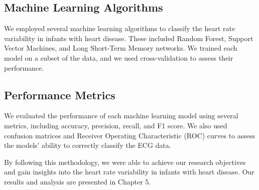 \subsection{Machine Learning Algorithms}

We employed several machine learning algorithms to classify the heart rate variability in infants with heart disease. These included Random Forest, Support Vector Machines, and Long Short-Term Memory networks. We trained each model on a subset of the data, and we used cross-validation to assess their performance.

\subsection{Performance Metrics}

We evaluated the performance of each machine learning model using several metrics, including accuracy, precision, recall, and F1 score. We also used confusion matrices and Receiver Operating Characteristic (ROC) curves to assess the models' ability to correctly classify the ECG data.

By following this methodology, we were able to achieve our research objectives and gain insights into the heart rate variability in infants with heart disease. Our results and analysis are presented in Chapter 5.


